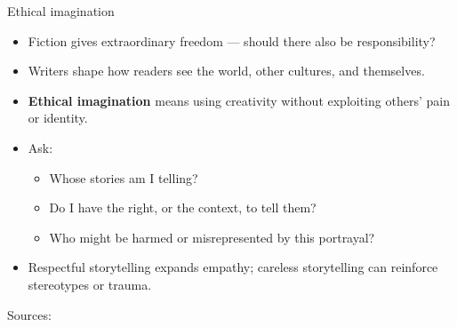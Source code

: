 \documentclass[aspectratio=169]{beamer}
\begin{document}
\begin{frame}{Ethical imagination}
\begin{itemize}
  \item Fiction gives extraordinary freedom — should there also be responsibility?  
  \item Writers shape how readers see the world, other cultures, and themselves.  
  \item \textbf{Ethical imagination} means using creativity without exploiting others’ pain or identity.  
  \item Ask:
    \begin{itemize}
      \item Whose stories am I telling?  
      \item Do I have the right, or the context, to tell them?  
      \item Who might be harmed or misrepresented by this portrayal?  
    \end{itemize}
  \item Respectful storytelling expands empathy; careless storytelling can reinforce stereotypes or trauma.
\end{itemize}

\medskip
\small Sources: \citep{hachette2021guidediversity, haynes2021ethicsaesthetics, leclerc2024writing}
\end{frame}
\end{document}
